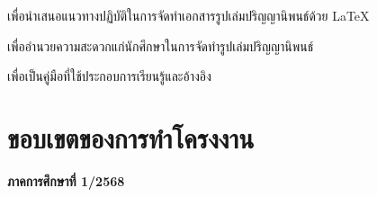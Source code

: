 \begin{mycustomenum}[label=1.2.\arabic*] %
    \item เพื่อนำเสนอแนวทางปฏิบัติในการจัดทำเอกสารรูปเล่มปริญญานิพนธ์ด้วย LaTeX
    \item เพื่ออำนวยความสะดวกแก่นักศึกษาในการจัดทำรูปเล่มปริญญานิพนธ์
    \item เพื่อเป็นคู่มือที่ใช้ประกอบการเรียนรู้และอ้างอิง
\end{mycustomenum}



\section{ขอบเขตของการทําโครงงาน} \label{sec1:scope}
\hspace*{1 cm}\textbf{ภาคการศึกษาที่ 1/2568}
